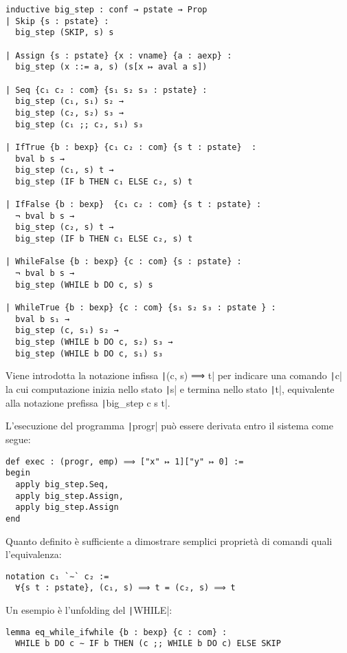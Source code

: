 \begin{verbatim}
inductive big_step : conf → pstate → Prop
| Skip {s : pstate} : 
  big_step (SKIP, s) s

| Assign {s : pstate} {x : vname} {a : aexp} : 
  big_step (x ::= a, s) (s[x ↦ aval a s])

| Seq {c₁ c₂ : com} {s₁ s₂ s₃ : pstate} : 
  big_step (c₁, s₁) s₂ →
  big_step (c₂, s₂) s₃ → 
  big_step (c₁ ;; c₂, s₁) s₃

| IfTrue {b : bexp} {c₁ c₂ : com} {s t : pstate}  : 
  bval b s →
  big_step (c₁, s) t → 
  big_step (IF b THEN c₁ ELSE c₂, s) t

| IfFalse {b : bexp}  {c₁ c₂ : com} {s t : pstate} :
  ¬ bval b s → 
  big_step (c₂, s) t →
  big_step (IF b THEN c₁ ELSE c₂, s) t

| WhileFalse {b : bexp} {c : com} {s : pstate} :
  ¬ bval b s →
  big_step (WHILE b DO c, s) s

| WhileTrue {b : bexp} {c : com} {s₁ s₂ s₃ : pstate } :
  bval b s₁ →
  big_step (c, s₁) s₂ →
  big_step (WHILE b DO c, s₂) s₃ →
  big_step (WHILE b DO c, s₁) s₃
\end{verbatim}
Viene introdotta la notazione infissa \texttt|(c, s) ⟹ t| per indicare una comando \texttt|c| la cui computazione inizia nello stato \texttt|s| e termina nello stato \texttt|t|, equivalente alla notazione prefissa \texttt|big_step c s t|. 

L'esecuzione del programma \texttt|progr| può essere derivata entro il sistema come segue:
\begin{verbatim}
def exec : (progr, emp) ⟹ ["x" ↦ 1]["y" ↦ 0] :=
begin
  apply big_step.Seq,
  apply big_step.Assign,
  apply big_step.Assign
end
\end{verbatim}

Quanto definito è sufficiente a dimostrare semplici proprietà di comandi quali l'equivalenza:
\begin{verbatim}
notation c₁ `∼` c₂ := 
  ∀{s t : pstate}, (c₁, s) ⟹ t = (c₂, s) ⟹ t
\end{verbatim}
Un esempio è l'unfolding del \texttt|WHILE|:
\begin{verbatim}
lemma eq_while_ifwhile {b : bexp} {c : com} : 
  WHILE b DO c ∼ IF b THEN (c ;; WHILE b DO c) ELSE SKIP
\end{verbatim}

